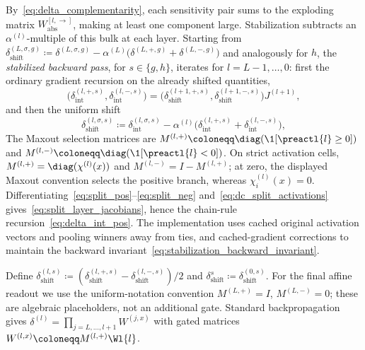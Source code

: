 By~\eqref{eq:delta_complementarity}, each sensitivity pair sums to the exploding matrix $W_{\mathrm{abs}}^{[l, \rightarrow]}$, making at least one component large. Stabilization subtracts an $\alpha^{(l)}$-multiple of this bulk at each layer. Starting from $\delta_{\mathrm{shift}}^{(L,\sigma,g)} \coloneqq \delta^{(L,\sigma,g)} - \alpha^{(L)} \bigl( \delta^{(L,+,g)} + \delta^{(L,-,g)} \bigr)$ and analogously for $h$, the \emph{stabilized backward pass}, for $s\in\{g,h\}$, iterates for $l = L-1, \dots, 0$: first the ordinary gradient recursion on the already shifted quantities,
\begin{equation}
\bigl(\delta_{\mathrm{int}}^{(l,+,s)},\delta_{\mathrm{int}}^{(l,-,s)}\bigr)
=\bigl(\delta_{\mathrm{shift}}^{(l+1,+,s)},\delta_{\mathrm{shift}}^{(l+1,-,s)}\bigr)J^{(l+1)},
\label{eq:delta_int_pos}
\end{equation}
and then the uniform shift
\begin{equation}
	\delta_{\mathrm{shift}}^{(l,\sigma,s)} \coloneqq \delta_{\mathrm{int}}^{(l,\sigma,s)} - \alpha^{(l)} \bigl( \delta_{\mathrm{int}}^{(l,+,s)} + \delta_{\mathrm{int}}^{(l,-,s)} \bigr),
	\label{eq:delta_shift_def}
\end{equation}
The Maxout selection matrices are $M^{(l,+)}\coloneqq\diag(\1[\preactl{l}\ge0])$ and $M^{(l,-)}\coloneqq\diag(\1[\preactl{l}<0])$. On strict activation cells, $M^{(l,+)}=\diag(\chi^{(l)}(x))$ and $M^{(l,-)}=I-M^{(l,+)}$; at zero, the displayed Maxout convention selects the positive branch, whereas $\chi^{(l)}_i(x)=0$. Differentiating~\eqref{eq:split_pos}--\eqref{eq:split_neg} and~\eqref{eq:dc_split_activations} gives~\eqref{eq:split_layer_jacobians}, hence the chain-rule recursion~\eqref{eq:delta_int_pos}. The implementation uses cached original activation vectors and pooling winners away from ties, and cached-gradient corrections to maintain the backward invariant~\eqref{eq:stabilization_backward_invariant}.

Define $\delta_{\mathrm{shift}}^{(l,s)}\coloneqq(\delta_{\mathrm{shift}}^{(l,+,s)}-\delta_{\mathrm{shift}}^{(l,-,s)})/2$ and $\delta^s_{\mathrm{shift}}\coloneqq\delta_{\mathrm{shift}}^{(0,s)}$. For the final affine readout we use the uniform-notation convention $M^{(L,+)}=I$, $M^{(L,-)}=0$; these are algebraic placeholders, not an additional gate. Standard backpropagation gives $\delta^{(l)} = \prod_{j = L, \dots, l+1} W^{(j,x)}$ with gated matrices $W^{(l,x)} \coloneqq M^{(l,+)} \Wl{l}$.

